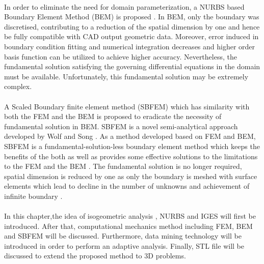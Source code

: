 \paragraph{}
In order to eliminate the need for domain parameterization, a NURBS based Boundary Element Method (BEM) is proposed \cite{Li2011,Taka2012,Beli2013,Sco2013,Sim2013}.
In BEM, only the boundary was discretised, contributing to a reduction of the spatial dimension by one and hence be fully compatible with CAD output geometric data.
Moreover, error induced in boundary condition fitting and numerical integration decreases and higher order basis function can be utilized to achieve higher accuracy.
Nevertheless, the fundamental solution satisfying the governing differential equations in the domain must be available.
Unfortunately, this fundamental solution may be extremely complex.

\paragraph{}
A Scaled Boundary finite element method (SBFEM) which has similarity with both the FEM and the BEM is proposed to eradicate the necessity of fundamental solution in BEM. SBFEM is a novel semi-analytical approach developed by Wolf and Song \cite{Wol1999}.
As a method developed based on FEM and BEM, SBFEM is a fundamental-solution-less boundary element method which keeps the benefits of the both as well as provides some effective solutions to the limitations to the FEM and the BEM \cite{Wol1999}.
The fundamental solution is no longer required, spatial dimension is reduced by one as only the boundary is meshed with surface elements which lead to decline in the number of unknowns and achievement of infinite boundary \cite{Wol2003}.

\paragraph{}
In this chapter,the idea of isogeometric analysis \cite{Hug2005}, NURBS and IGES will first be introduced.
After that, computational mechanics method including FEM, BEM and SBFEM will be discussed.
Furthermore, data mining technology will be introduced in order to perform an adaptive analysis.
Finally, STL file will be discussed to extend the proposed method to 3D problems.